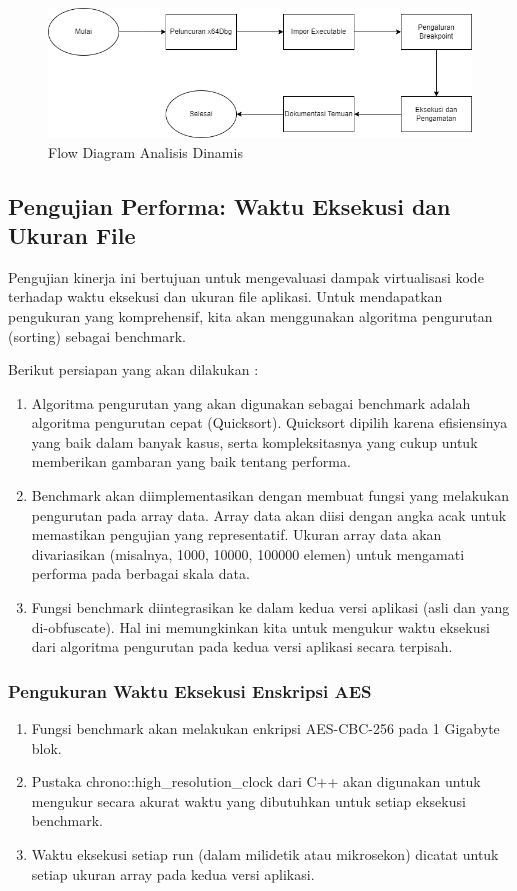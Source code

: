 \begin{figure}
	\centering
	\includegraphics[width=1\textwidth]
	{assets/pics/Dynamic.png}
	\caption{Flow Diagram Analisis Dinamis}
\end{figure}

\subsection{Pengujian Performa: Waktu Eksekusi dan Ukuran File}
Pengujian kinerja ini bertujuan untuk mengevaluasi dampak virtualisasi kode terhadap waktu eksekusi dan ukuran file aplikasi. Untuk mendapatkan pengukuran yang komprehensif, kita akan menggunakan algoritma pengurutan (sorting) sebagai benchmark.

Berikut persiapan yang akan dilakukan :
\begin{enumerate}
	\item {} Algoritma pengurutan yang akan digunakan sebagai benchmark adalah algoritma pengurutan cepat (Quicksort). Quicksort dipilih karena efisiensinya yang baik dalam banyak kasus, serta kompleksitasnya yang cukup untuk memberikan gambaran yang baik tentang performa.
	\item {} Benchmark akan diimplementasikan dengan membuat fungsi yang melakukan pengurutan pada array data. Array data akan diisi dengan angka acak untuk memastikan pengujian yang representatif. Ukuran array data akan divariasikan (misalnya, 1000, 10000, 100000 elemen) untuk mengamati performa pada berbagai skala data.
	\item {} Fungsi benchmark diintegrasikan ke dalam kedua versi aplikasi (asli dan yang di-obfuscate). Hal ini memungkinkan kita untuk mengukur waktu eksekusi dari algoritma pengurutan pada kedua versi aplikasi secara terpisah.
\end{enumerate}

\subsubsection{Pengukuran Waktu Eksekusi Enskripsi AES}
\begin{enumerate}
	\item {} Fungsi benchmark akan melakukan enkripsi AES-CBC-256 pada 1 Gigabyte blok.
	\item {} Pustaka chrono::high\_resolution\_clock dari C++ akan digunakan untuk mengukur secara akurat waktu yang dibutuhkan untuk setiap eksekusi benchmark.
	\item {} Waktu eksekusi setiap run (dalam milidetik atau mikrosekon) dicatat untuk setiap ukuran array pada kedua versi aplikasi.
\end{enumerate}

